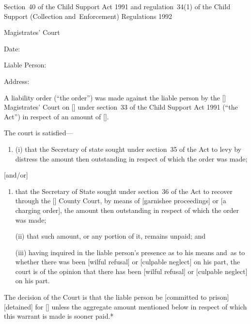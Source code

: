 \documentclass[12pt,a4paper]{article}
\begin{document}
\renewcommand\parthead{--- Schedule~3}

\noindent
Section~40 of the Child Support Act 1991 and regulation~34(1) of the Child Support (Collection and~Enforcement) Regulations 1992

\medskip

{\raggedleft \hspace{0.5\linewidth}\dotfill Magistrates' Court

}

\medskip

Date:

\medskip

Liable Person:

\medskip

Address:

\medskip

A liability order (``the order'') was made against the liable person by the [\phantom{Bolton}] Magistrates' Court on [\phantom{\today}] under section~33 of the Child Support Act 1991 (``the Act'') in respect of an amount of [\phantom{£100.00}].

The court is satisfied---
\begin{enumerate}
\item[]
(i) that the Secretary of state sought under section~35 of the Act to levy by distress the amount then outstanding in respect of which the order was made;
\end{enumerate}
[and/or]
\begin{enumerate}\item[]
that the Secretary of State sought under section~36 of the Act to recover through the [\phantom{Bolton}] County Court, by means of [garnishee proceedings] or [a charging order], the amount then outstanding in respect of which the order was made;

(ii) that such amount, or any portion of it, remains unpaid; and

(iii) having inquired in the liable person's presence as to his means and~as to whether there was been [wilful refusal] or [culpable neglect] on his part, the court is of the opinion that there has been [wilful refusal] or [culpable neglect] on his part.
\end{enumerate}

The decision of the Court is that the liable person be [committed to prison] [detained] for [\phantom{7 days}] unless the aggregate amount mentioned below in respect of which this warrant is made is sooner paid.*

\medskip
\end{document}
